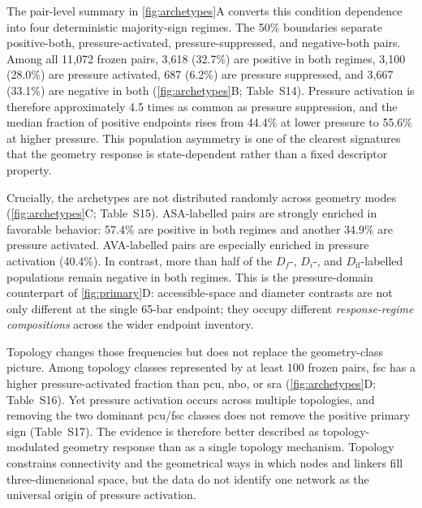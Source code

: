 \documentclass[11pt,a4paper]{article}
\newcommand{\SItab}[1]{Table~S#1}
\begin{document}
The pair-level summary in \cref{fig:archetypes}A converts this condition dependence
into four deterministic majority-sign regimes. The 50\% boundaries separate
positive-both, pressure-activated, pressure-suppressed, and negative-both pairs.
Among all 11,072 frozen pairs, 3,618 (32.7\%) are positive in both regimes, 3,100
(28.0\%) are pressure activated, 687 (6.2\%) are pressure suppressed, and 3,667
(33.1\%) are negative in both (\cref{fig:archetypes}B; \SItab{14}). Pressure
activation is therefore approximately 4.5 times as common as pressure suppression,
and the median fraction of positive endpoints rises from 44.4\% at lower pressure
to 55.6\% at higher pressure. This population asymmetry is one of the clearest
signatures that the geometry response is state-dependent rather than a fixed
descriptor property.

Crucially, the archetypes are not distributed randomly across geometry modes
(\cref{fig:archetypes}C; \SItab{15}). ASA-labelled pairs are strongly enriched in
favorable behavior: 57.4\% are positive in both regimes and another 34.9\% are
pressure activated. AVA-labelled pairs are especially enriched in pressure
activation (40.4\%). In contrast, more than half of the $D_f$-, $D_i$-, and
$D_{\mathrm{if}}$-labelled populations remain negative in both regimes. This is
the pressure-domain counterpart of \cref{fig:primary}D: accessible-space and
diameter contrasts are not only different at the single 65-bar endpoint; they
occupy different \emph{response-regime compositions} across the wider endpoint
inventory.

Topology changes those frequencies but does not replace the geometry-class picture.
Among topology classes represented by at least 100 frozen pairs, fsc has a higher
pressure-activated fraction than pcu, nbo, or sra
(\cref{fig:archetypes}D; \SItab{16}). Yet pressure activation occurs across
multiple topologies, and removing the two dominant pcu/fsc classes does not remove
the positive primary sign (\SItab{17}). The evidence is therefore better described
as topology-modulated geometry response than as a single topology mechanism.
Topology constrains connectivity and the geometrical ways in which nodes and
linkers fill three-dimensional space, but the data do not identify one network as
the universal origin of pressure activation.
\end{document}
